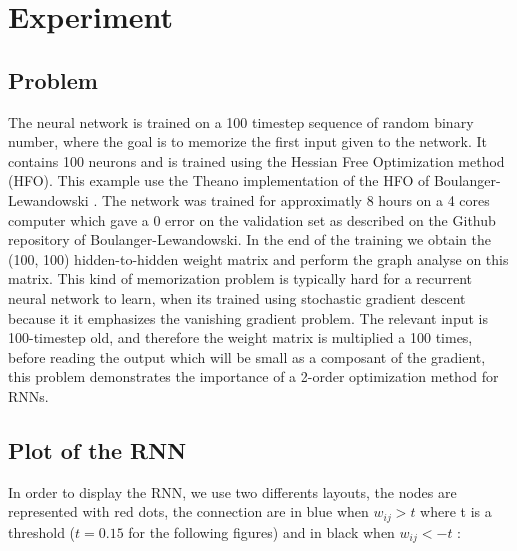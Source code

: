 \section{Experiment}

\subsection{Problem}

The neural network is trained on a 100 timestep sequence of random binary number, where the goal is to memorize the first input given to the network. It contains 100 neurons and is trained using the Hessian Free Optimization method (HFO). This example use the Theano implementation of the HFO of Boulanger-Lewandowski \cite{boulanger2012modeling}. The network was trained for approximatly 8 hours on a 4 cores computer which gave a 0 error on the validation set as described on the Github repository of Boulanger-Lewandowski. In the end of the training we obtain the (100, 100) hidden-to-hidden weight matrix and perform the graph analyse on this matrix. This kind of memorization problem is typically hard for a recurrent neural network to learn, when its trained using stochastic gradient descent because it it emphasizes the vanishing gradient problem. The relevant input is 100-timestep old, and therefore the weight matrix is multiplied a 100 times, before reading the output which will be small as a composant of the gradient, this problem demonstrates the importance of a 2-order optimization method for RNNs. 

\subsection{Plot of the RNN}

In order to display the RNN, we use two differents layouts, the nodes are represented with red dots, the connection are in blue when $w_{ij}  > t $ where t is a threshold ($ t=0.15$ for the following figures) and in black when $w_{ij} < - t$  :

